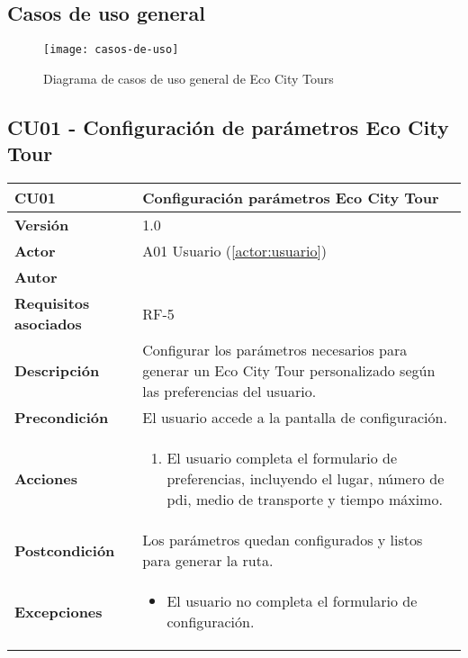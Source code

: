 \subsection{Casos de uso general}

\begin{figure}[H]
	\centering
	\hspace*{-2cm}
	\texttt{[image: casos-de-uso]}
	\caption{Diagrama de casos de uso general de Eco City Tours}
	\label{fig:casos-de-uso}
\end{figure}

\subsection{CU01 - Configuración de parámetros Eco City Tour}

\begin{table}[H]
	\centering
	\begin{tabularx}{\linewidth}{ p{} p{} }
		\toprule
		\textbf{CU01}    & \textbf{Configuración parámetros Eco City Tour} \\
		\toprule
		\textbf{Versión}              & 1.0    \\
		\textbf{Actor}                & A01 Usuario (\ref{actor:usuario}) \\
		\textbf{Autor}                & \autor \\
		\textbf{Requisitos asociados} & RF-5 \\
		\textbf{Descripción}          & Configurar los parámetros necesarios para generar un Eco City Tour personalizado según las preferencias del usuario. \\
		\textbf{Precondición}         & El usuario accede a la pantalla de configuración. \\
		\textbf{Acciones}             &
		\begin{enumerate}
			\def\labelenumi{\arabic{enumi}.}
			\tightlist
			\item El usuario completa el formulario de preferencias, incluyendo el lugar, número de \acrshort{pdi}, medio de transporte y tiempo máximo.
		\end{enumerate}\\
		\textbf{Postcondición}        & Los parámetros quedan configurados y listos para generar la ruta. \\
		\textbf{Excepciones}          & 
		\begin{itemize}
			\tightlist
			\item El usuario no completa el formulario de configuración.

\end{itemize}
\end{tabularx}
\end{table}
